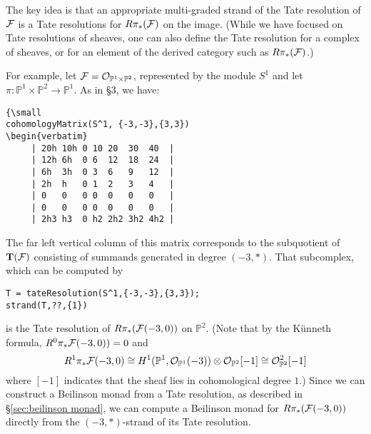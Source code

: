 \documentclass[twoside,12pt, leqno]{amsart}
\def\PP{{\mathbb P}}
\def\bT{{\bf T}}
\def\bU{{\bf U}}
\begin{document}
The key idea is that an appropriate multi-graded strand of the Tate resolution of ${\mathcal F}$ is a Tate resolutions for $R\pi_*({\mathcal F})$ on the image.  (While we have focused on Tate resolutions of sheaves, one can also define the Tate resolution for a complex of sheaves, or for an element of the derived category such as $R\pi_*({\mathcal F})$.)

For example, let $\sF=\cO_{\PP^1\times \PP^2}$, represented by the module $S^1$ and let $\pi:\PP^1\times \PP^2\to \PP^1$.  As in \S3, we have:
\begin{verbatim}
{\small 
cohomologyMatrix(S^1, {-3,-3},{3,3})
\begin{verbatim}
     | 20h 10h 0 10 20  30  40  |
     | 12h 6h  0 6  12  18  24  |
     | 6h  3h  0 3  6   9   12  |
     | 2h  h   0 1  2   3   4   |
     | 0   0   0 0  0   0   0   |
     | 0   0   0 0  0   0   0   |
     | 2h3 h3  0 h2 2h2 3h2 4h2 |
\end{verbatim}
The far left vertical column of this matrix corresponds to the subquotient of $\bT(\sF)$ consisting of summands generated in degree $(-3,*)$.  That subcomplex, which can be computed by
\begin{verbatim}
T = tateResolution(S^1,{-3,-3},{3,3});
strand(T,??,{1})
\end{verbatim}
is the Tate resolution of $R\pi_*({\mathcal F}(-3,0))$ on $\PP^2$.  (Note that by the K\"unneth formula, $R^0\pi_* {\mathcal F}(-3,0))=0$ and
\[
R^1\pi_*\sF(-3,0)\cong H^1(\PP^1,\cO_{\PP^1}(-3))\otimes \cO_{\PP^2}[-1] \cong \cO_{\PP^2}^2[-1]
\]
where $[-1]$ indicates that the sheaf lies in cohomological degree $1$.)  Since we can construct a Beilinson monad from a Tate resolution, as described in \S\ref{sec:beilinson monad}, we can compute a Beilinson monad for $R\pi_*({\mathcal F}(-3,0))$ directly from the $(-3,*)$-strand of its Tate resolution.


%
%
%
\end{document}
